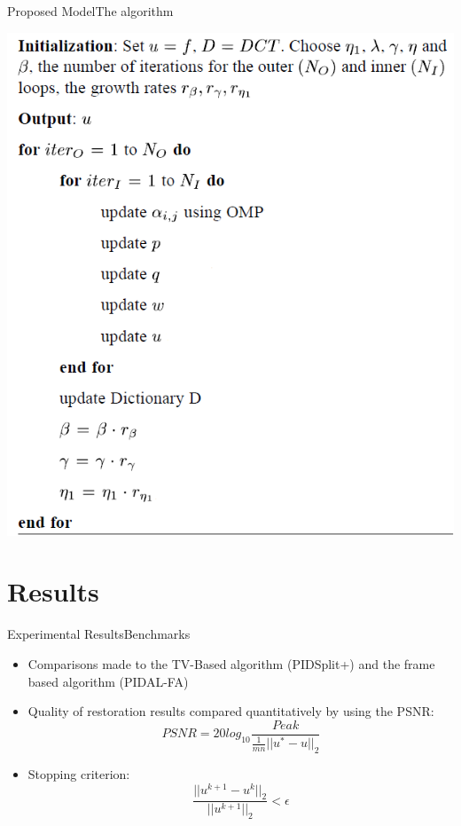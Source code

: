 \documentclass{beamer}
\begin{document}
\begin{frame}{Proposed Model}{The algorithm}

 \centering
    \includegraphics[scale=0.48]{algo.png}

\end{frame}

\section{Results}
\begin{frame}[t]{Experimental Results}{Benchmarks}
\begin{itemize}
    \item Comparisons made to the TV-Based algorithm (PIDSplit+) and the frame based algorithm (PIDAL-FA)
    \item Quality of restoration results compared quantitatively by using the PSNR: 
    \[
    PSNR = 20log_{10} \frac{Peak}{\frac{1}{mn} ||u^* - u ||_2}
    \]
    \item Stopping criterion:
    \[
    \frac{||u^{k+1} - u^k||_2}{||u^{k+1}||_2} < \epsilon
    \]
    
\end{itemize}
\end{frame}
\end{document}
